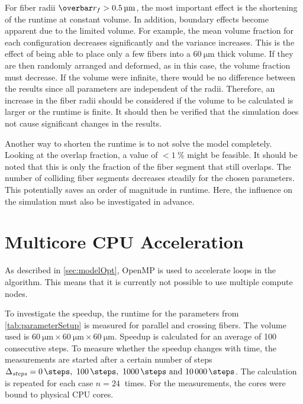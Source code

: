 %
For fiber radii $\fiberRadiusMean > \SI{0.5}{\micro\meter}$, the most important effect is the shortening of the runtime at constant volume.
In addition, boundary effects become apparent due to the limited volume.
For example, the mean volume fraction for each configuration decreases significantly and the variance increases.
This is the effect of being able to place only a few fibers into a $\SI{60}{\micro\meter}$ thick volume.
If they are then randomly arranged and deformed, as in this case, the volume fraction must decrease.
If the volume were infinite, there would be no difference between the results since all parameters are independent of the radii.
Therefore, an increase in the fiber radii should be considered if the volume to be calculated is larger or the runtime is finite.
It should then be verified that the simulation does not cause significant changes in the results.
\par
%
Another way to shorten the runtime is to not solve the model completely.
Looking at the overlap fraction, a value of $<\SI{1}{\percent}$ might be feasible.
It should be noted that this is only the fraction of the fiber segment that still overlaps.
The number of colliding fiber segments decreases steadily for the chosen parameters.
This potentially saves an order of magnitude in runtime.
Here, the influence on the simulation must also be investigated in advance.
%
%
%
\section{Multicore CPU Acceleration}
%
As described in \cref{sec:modelOpt}, \ac{OpenMP} is used to accelerate  loops in the algorithm.
This means that it is currently not possible to use multiple compute nodes.
\par
% 
To investigate the speedup, the runtime for the parameters from \cref{tab:parameterSetup} is measured for parallel and crossing fibers.
The volume used is $\SI{60}{\micro\meter} \times \SI{60}{\micro\meter} \times \SI{60}{\micro\meter}$.
Speedup is calculated for an average of 100 consecutive steps.
To measure whether the speedup changes with time, the measurements are started after a certain number of steps $\Delta_{\mathit{steps}} = \SIlist{0;100;1000;10000}{\steps}$.
The calculation is repeated for each case $n=\SI{24}{}$ times.
For the measurements, the cores were bound to physical CPU cores.
%
% 
% 
